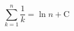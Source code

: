 \documentclass[nofonts]{ctexart}
\begin{document}
\begin{equation*}
	\sum_{k=1}^n \frac{1}{k} = \ln{n} + \mathrm{C} \tag*{[Euler]}
\end{equation*}
\end{document}

